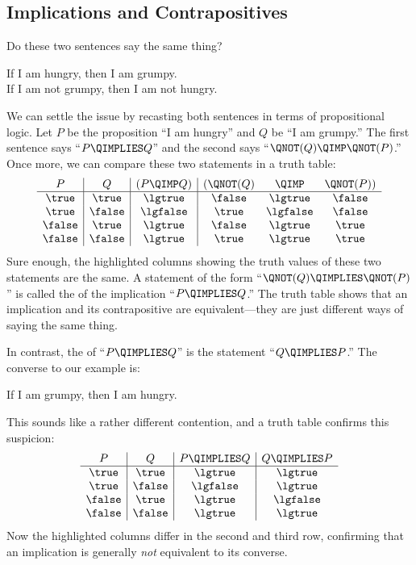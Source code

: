 \subsection{Implications and Contrapositives}\label{implication_sec}
Do these two sentences say the same thing?
\begin{center}
If I am hungry, then I am grumpy. \\
If I am not grumpy, then I am not hungry.
\end{center}
We can settle the issue by recasting both sentences in terms of
propositional logic.  Let $P$ be the proposition ``I am hungry'' and $Q$
be ``I am grumpy.''  The first sentence says ``$P \QIMPLIES Q$'' and the
second says ``$\QNOT(Q) \QIMP \QNOT(P)$.''  Once more, we can compare
these two statements in a truth table:
\[
\begin{array}{c|c|c|ccc}
   P   &   Q    & (P  \QIMP  Q) & (\QNOT(Q) & \QIMP & \QNOT(P)) \\ \hline
\true  & \true  &     \lgtrue   &  \false   & \lgtrue  &  \false\\
\true  & \false &     \lgfalse  &  \true    & \lgfalse &  \false\\
\false & \true  &     \lgtrue   &  \false   & \lgtrue  &  \true \\
\false & \false &     \lgtrue   &  \true    & \lgtrue  &  \true \\
\end{array}
\]
Sure enough, the highlighted columns showing the truth values of these two
statements are the same.  A statement of the form ``$\QNOT (Q) \QIMPLIES
\QNOT (P)$'' is called the  of the implication ``$P
\QIMPLIES Q$.''  The truth table shows that an implication and its
contrapositive are equivalent---they are just different ways of saying
the same thing.

In contrast, the  of ``$P \QIMPLIES Q$'' is the statement
``$Q \QIMPLIES P$.''  The converse to our example is:
\begin{center}
If I am grumpy, then I am hungry.
\end{center}
This sounds like a rather different contention, and a truth table
confirms this suspicion:
\[
\begin{array}{c|c|c|c}
P & Q &
    P \QIMPLIES Q &
    Q \QIMPLIES P \\ \hline
\true & \true & \lgtrue & \lgtrue \\
\true & \false & \lgfalse & \lgtrue \\
\false & \true & \lgtrue & \lgfalse \\
\false & \false & \lgtrue & \lgtrue
\end{array}
\]
Now the highlighted columns differ in the second and third row, confirming
that an implication is generally \textit{not} equivalent to its converse.

